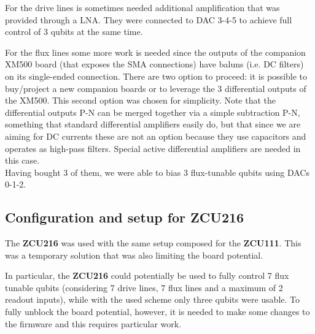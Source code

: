 For the drive lines is sometimes needed additional amplification that was provided through a LNA.
They were connected to DAC 3-4-5 to achieve full control of 3 qubits at the same time.

For the flux lines some more work is needed since the outputs of the companion XM500 board (that exposes the SMA connections) have baluns (i.e. DC filters) on its single-ended connection.
There are two option to proceed: it is possible to buy/project a new companion boards or to leverage the 3 differential outputs of the XM500.
This second option was chosen for simplicity.
Note that the differential outputs P-N can be merged together via a simple subtraction P-N, something that standard differential amplifiers easily do, but that since we are aiming for DC currents these are not an option because they use capacitors and operates as high-pass filters.
Special active differential amplifiers are needed in this case.\\
Having bought 3 of them, we were able to bias 3 flux-tunable qubits using DACs 0-1-2.

\subsection{Configuration and setup for ZCU216}

The \textbf{ZCU216} was used with the same setup composed for the \textbf{ZCU111}.
This was a temporary solution that was also limiting the board potential.

In particular, the \textbf{ZCU216} could potentially be used to fully control 7 flux tunable qubits (considering 7 drive lines, 7 flux lines and a maximum of 2 readout inputs), while with the used scheme only three qubits were usable.
To fully unblock the board potential, however, it is needed to make some changes to the \Qick firmware and this requires particular work.

